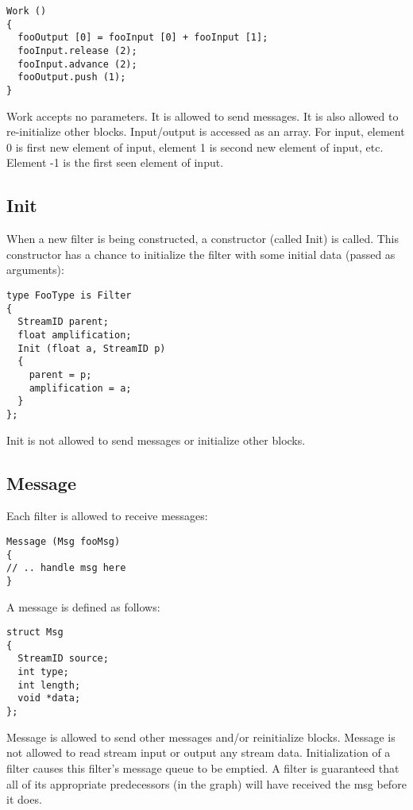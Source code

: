 \documentclass[twocolumn, draft]{article}
\begin{document}
\begin{verbatim}
Work ()
{
  fooOutput [0] = fooInput [0] + fooInput [1];
  fooInput.release (2);
  fooInput.advance (2);
  fooOutput.push (1);
}
\end{verbatim}

Work accepts no parameters.  It is allowed to send messages.  It is also
allowed to re-initialize other blocks.
Input/output
is accessed as an array.  For input, element 0 is first new element of input,
element 1 is second new element of input, etc.  Element -1 is the first seen
element of input.

\subsection{Init}

When a new filter is being constructed, a constructor (called Init) is called.
This constructor has a chance to initialize the filter with some initial
data (passed as arguments):

\begin{verbatim}
type FooType is Filter
{
  StreamID parent;
  float amplification;
  Init (float a, StreamID p)
  {
    parent = p;
    amplification = a;
  }
};
\end{verbatim}

Init is not allowed to send messages or initialize other blocks.

\subsection{Message}

Each filter is allowed to receive messages:

\begin{verbatim}
Message (Msg fooMsg)
{
// .. handle msg here
}
\end{verbatim}

A message is defined as follows:

\begin{verbatim}
struct Msg
{
  StreamID source;
  int type;
  int length;
  void *data;
};
\end{verbatim}

Message is allowed to send other messages and/or reinitialize blocks.
Message is not allowed to read stream input or output any stream data.
Initialization of a filter causes this filter's message queue to be emptied.
A filter is guaranteed that all of its appropriate predecessors (in the graph)
will have received the msg before it does.
\end{document}
